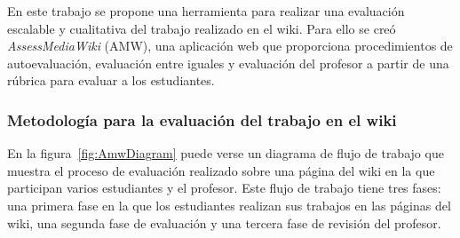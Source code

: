 En este trabajo se propone una herramienta para realizar una evaluación escalable y cualitativa del trabajo realizado en el wiki. Para ello se creó \emph{AssessMediaWiki} (AMW), una aplicación web que proporciona procedimientos de autoevaluación, evaluación entre iguales y evaluación del profesor a partir de una rúbrica para evaluar a los estudiantes.

\subsubsection{Metodología para la evaluación del trabajo en el wiki}

En la figura~\ref{fig:AmwDiagram} puede verse un diagrama de flujo de trabajo que muestra el proceso de evaluación realizado sobre una página del wiki en la que participan varios estudiantes y el profesor. Este flujo de trabajo tiene tres fases: una primera fase en la que los estudiantes realizan sus trabajos en las páginas del wiki, una segunda fase de evaluación y una tercera fase de revisión del profesor.

